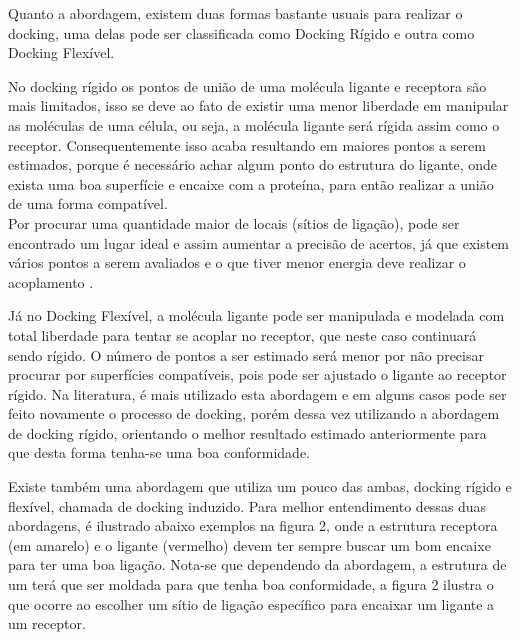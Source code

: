 \documentclass[tcc, capa]{texucpel}
\begin{document}
Quanto a abordagem, existem duas formas bastante usuais para realizar o docking, uma delas pode ser classificada como Docking Rígido e outra como Docking Flexível.

No docking rígido os pontos de união de uma molécula ligante e receptora são mais limitados, isso se deve ao fato de existir uma menor liberdade em manipular as moléculas de uma célula, ou seja, a molécula ligante será rígida assim como o receptor. 
Consequentemente isso acaba resultando em maiores pontos a serem estimados, porque é necessário achar algum ponto do estrutura do ligante, onde exista uma boa superfície  e encaixe com a proteína, para então realizar a união de uma forma compatível. \\
Por procurar uma quantidade maior de locais (sítios de ligação), pode ser encontrado um lugar ideal e assim aumentar a precisão de acertos, já que existem vários pontos a serem avaliados e o que tiver menor energia deve realizar o acoplamento \cite{pagadala2017software}. 

Já no Docking Flexível, a molécula ligante pode ser manipulada e modelada com total liberdade para tentar se acoplar no receptor,  que neste caso continuará sendo rígido. 
O número de pontos a ser estimado será menor por não precisar procurar por superfícies compatíveis, pois pode ser ajustado o ligante ao receptor rígido.
Na literatura, é mais utilizado esta abordagem e em alguns casos pode ser feito novamente o processo de docking, porém dessa vez utilizando a abordagem de docking rígido, orientando o melhor resultado estimado anteriormente para que desta forma tenha-se uma boa conformidade.

Existe também uma abordagem que utiliza um pouco das ambas, docking rígido e flexível, chamada de docking induzido.
Para melhor entendimento dessas duas abordagens, é ilustrado abaixo  exemplos na figura 2, onde a estrutura receptora (em amarelo) e o ligante (vermelho) devem ter sempre buscar um bom encaixe para ter uma boa ligação. Nota-se que dependendo da abordagem, a estrutura de um terá que ser moldada para que tenha boa conformidade, a figura 2 ilustra o que ocorre ao escolher um sítio de ligação específico para encaixar um ligante a um receptor.
\end{document}
